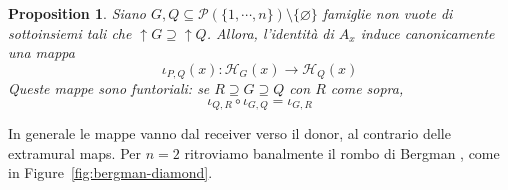 \documentclass[a4paper]{article}
\newtheorem{proposition}[theorem]{Proposition}
\begin{document}
\begin{proposition}
    Siano \(G,Q \subseteq \mathcal P(\{1, \cdots, n\}) \setminus \{\varnothing\}\) famiglie non vuote
    di sottoinsiemi tali che \(\uparrow G \supseteq \uparrow Q\). Allora, l'identità di \(A_x\) induce canonicamente una mappa
    \[
        \iota_{P,Q}(x) \colon \mathcal H_G(x) \to \mathcal H_Q(x)
    \]
    Queste mappe sono funtoriali: se \(R \supseteq G \supseteq Q\) con \(R\) come sopra,
    \[
        \iota_{Q,R} \circ \iota_{G,Q} = \iota_{G,R}
    \]
\end{proposition}

In generale le mappe vanno dal receiver verso il donor, al contrario delle extramural maps.
Per \(n=2\) ritroviamo banalmente il rombo di Bergman \cite{bergman2012diagramchasing}, come in Figure~\ref{fig:bergman-diamond}.
\begin{center}
\label{fig:bergman-diamond}
\end{center}

\clearpage
\listoffigures
\printbibliography
\end{document}
